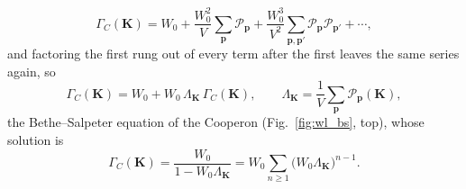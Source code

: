 \[
\Gamma_C(\mathbf K)=W_0+\frac{W_0^2}{V}\sum_{\mathbf p}\mathcal P_{\mathbf p}
+\frac{W_0^3}{V^2}\sum_{\mathbf p,\mathbf p'}\mathcal P_{\mathbf p}\mathcal P_{\mathbf p'}+\cdots ,
\]
and factoring the first rung out of every term after the first leaves the same series again, so
\begin{equation}
    \Gamma_C(\mathbf K)=W_0+W_0\,\Lambda_{\mathbf K}\,\Gamma_C(\mathbf K),\qquad
    \Lambda_{\mathbf K}=\frac1V\sum_{\mathbf p}\mathcal P_{\mathbf p}(\mathbf K),
    \label{eq:wl_BS}
\end{equation}
the Bethe--Salpeter equation of the Cooperon (Fig.~\ref{fig:wl_bs}, top), whose solution is
\begin{equation}
    \Gamma_C(\mathbf K)=\frac{W_0}{1-W_0\Lambda_{\mathbf K}}=W_0\sum_{n\ge1}\big(W_0\Lambda_{\mathbf K}\big)^{n-1}.
    \label{eq:wl_Gamma}
\end{equation}

